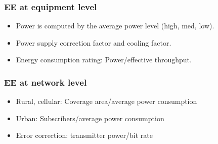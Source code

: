 \documentclass[a4paper,11pt,handout]{beamer}
\begin{document}
\begin{frame}
\frametitle{EE at equipment level}

\begin{itemize}

	\item Power is computed by the average power level (high, med, low).
	\item Power supply correction factor and cooling factor.
	\item Energy consumption rating: Power/effective throughput.

\end{itemize}
\end{frame}
\note{

}
\begin{frame}
\frametitle{EE at network level}

\begin{itemize}

	\item Rural, cellular: Coverage area/average power consumption
	\item Urban: Subscribers/average power consumption
	\item Error correction: transmitter power/bit rate

\end{itemize}
\end{frame}
\note{}
\end{document}
